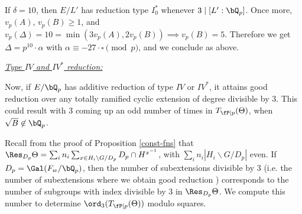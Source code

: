 If $\delta = 10$, then $E / L'$ has reduction type $I_0^*$ whenever $3 \mid [ L' : \bQ_p]$. Once more, $v_p(A)$, $v_p(B) \geq 1$, and $v_p(\Delta) = 10 = \min(3 v_p(A), 2 v_p(B)) \implies v_p(B) = 5$. Therefore we get $\Delta = p^{10} \cdot \alpha$ with $\alpha \equiv -27\cdot\square \pmod p$, and we conclude as above.

\vspace{1em}

\noindent\underline{\textit{Type $IV$ and $IV^*$ reduction:}}

Now, if $E /\bQ_p$ has additive reduction of type $IV$ or $IV^*$, it attains good reduction over any totally ramified cyclic extension of degree divisible by $3$. This could result with $3$ coming up an odd number of times in $T_{\fP \mid p}(\Theta)$, when $\sqrt{B} \not\in \bQ_p$. 


Recall from the proof of Proposition \ref{const-fns} that $\Res_{D_p} \Theta = \sum_i n_i \sum_{x \in H_i \backslash G / D_p} D_p \cap H^{x^{-1}}$, with $\sum_i n_i | H_i \backslash G / D_p|$ even. If $D_p = \Gal(F_w / \bQ_p)$, then the number of subextensions divisible by $3$ (i.e. the number of subextensions where we obtain good reduction ) corresponds to the number of subgroups with index divisible by $3$ in $\Res_{D_p}\Theta$. We compute this number to determine $\ord_3(T_{\fP \mid p}(\Theta))$ modulo squares.

